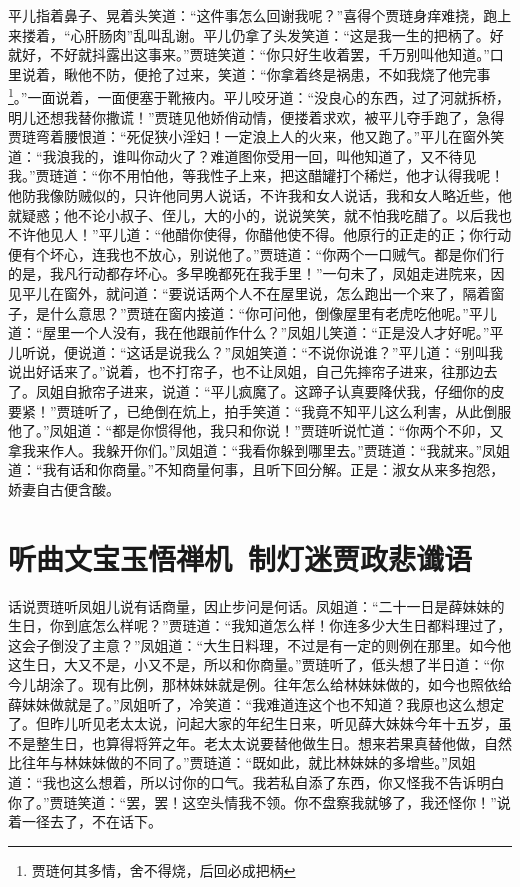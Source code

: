 \documentclass[12pt,oneside]{book}
\begin{document}
平儿指着鼻子、晃着头笑道：“这件事怎么回谢我呢？”喜得个贾琏身痒难挠，跑上来搂着，“心肝肠肉”乱叫乱谢。平儿仍拿了头发笑道：“这是我一生的把柄了。好就好，不好就抖露出这事来。”贾琏笑道：“你只好生收着罢，千万别叫他知道。”口里说着，瞅他不防，便抢了过来，笑道：“你拿着终是祸患，不如我烧了他完事\footnote{贾琏何其多情，舍不得烧，后回必成把柄}。”一面说着，一面便塞于靴掖内。平儿咬牙道：“没良心的东西，过了河就拆桥，明儿还想我替你撒谎！”贾琏见他娇俏动情，便搂着求欢，被平儿夺手跑了，急得贾琏弯着腰恨道：“死促狭小淫妇！一定浪上人的火来，他又跑了。”平儿在窗外笑道：“我浪我的，谁叫你动火了？难道图你受用一回，叫他知道了，又不待见我。”贾琏道：“你不用怕他，等我性子上来，把这醋罐打个稀烂，他才认得我呢！他防我像防贼似的，只许他同男人说话，不许我和女人说话，我和女人略近些，他就疑惑；他不论小叔子、侄儿，大的小的，说说笑笑，就不怕我吃醋了。以后我也不许他见人！”平儿道：“他醋你使得，你醋他使不得。他原行的正走的正；你行动便有个坏心，连我也不放心，别说他了。”贾琏道：“你两个一口贼气。都是你们行的是，我凡行动都存坏心。多早晚都死在我手里！”一句未了，凤姐走进院来，因见平儿在窗外，就问道：“要说话两个人不在屋里说，怎么跑出一个来了，隔着窗子，是什么意思？”贾琏在窗内接道：“你可问他，倒像屋里有老虎吃他呢。”平儿道：“屋里一个人没有，我在他跟前作什么？”凤姐儿笑道：“正是没人才好呢。”平儿听说，便说道：“这话是说我么？”凤姐笑道：“不说你说谁？”平儿道：“别叫我说出好话来了。”说着，也不打帘子，也不让凤姐，自己先摔帘子进来，往那边去了。凤姐自掀帘子进来，说道：“平儿疯魔了。这蹄子认真要降伏我，仔细你的皮要紧！”贾琏听了，已绝倒在炕上，拍手笑道：“我竟不知平儿这么利害，从此倒服他了。”凤姐道：“都是你惯得他，我只和你说！”贾琏听说忙道：“你两个不卯，又拿我来作人。我躲开你们。”凤姐道：“我看你躲到哪里去。”贾琏道：“我就来。”凤姐道：“我有话和你商量。”不知商量何事，且听下回分解。正是：淑女从来多抱怨，娇妻自古便含酸。

 

\chapter{听曲文宝玉悟禅机~制灯迷贾政悲谶语}
话说贾琏听凤姐儿说有话商量，因止步问是何话。凤姐道：“二十一日是薛妹妹的生日，你到底怎么样呢？”贾琏道：“我知道怎么样！你连多少大生日都料理过了，这会子倒没了主意？”凤姐道：“大生日料理，不过是有一定的则例在那里。如今他这生日，大又不是，小又不是，所以和你商量。”贾琏听了，低头想了半日道：“你今儿胡涂了。现有比例，那林妹妹就是例。往年怎么给林妹妹做的，如今也照依给薛妹妹做就是了。”凤姐听了，冷笑道：“我难道连这个也不知道？我原也这么想定了。但昨儿听见老太太说，问起大家的年纪生日来，听见薛大妹妹今年十五岁，虽不是整生日，也算得将笄之年。老太太说要替他做生日。想来若果真替他做，自然比往年与林妹妹做的不同了。”贾琏道：“既如此，就比林妹妹的多增些。”凤姐道：“我也这么想着，所以讨你的口气。我若私自添了东西，你又怪我不告诉明白你了。”贾琏笑道：“罢，罢！这空头情我不领。你不盘察我就够了，我还怪你！”说着一径去了，不在话下。
\end{document}
